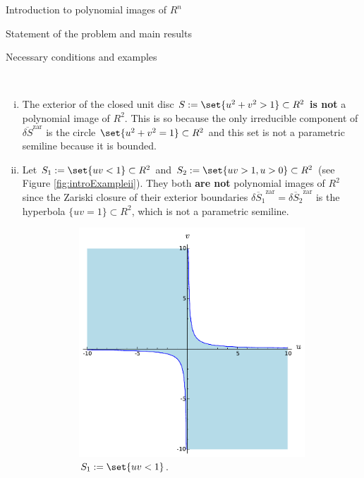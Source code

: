 \documentclass[11pt, a4paper, english, twoside, notitlepage, openright]{report}
\begin{document}
\begin{chapter}{Introduction to polynomial images of $R^n$}
\begin{section}{Statement of the problem and main results}
\begin{subsection}{Necessary conditions and examples}
\begin{examples}\label{introExample}
\
\begin{enumerate}[(i)]
\item The exterior of the closed unit disc $S:=\set{u^2+v^2>1}\subset R^2$ \textbf{is not} a polynomial image of $R^2$. This is so because the only irreducible component of $\overline{\delta S}^{\text{zar}}$ is the circle $\set{u^2+v^2=1}\subset R^2$ and this set is not a parametric semiline because it is bounded.
			
\item Let $S_1:=\set{uv<1}\subset R^2$ and $S_2:=\set{uv>1,u>0}\subset R^2$ (see Figure \ref{fig:introExampleii}). They both \textbf{are not} polynomial images of $R^2$ since the Zariski closure of their exterior boundaries $\overline{\delta S_1}^{\text{zar}}=\overline{\delta S_2}^{\text{zar}}$ is the hyperbola $\{uv=1\}\subset R^2$, which is not a parametric semiline.
\begin{figure}[h]\hspace{0.1cm}
\begin{subfigure}{.49\linewidth}\centering
\includegraphics[width=1\textwidth]{plots/ch1_01_S_1.pdf}
\caption{$S_1:=\set{uv<1}$.\label{fig:S_1}}
\end{subfigure}
\begin{subfigure}{.49\linewidth}\centering

\end{subfigure}
\end{figure}
\end{enumerate}
\end{examples}
\end{subsection}
\end{section}
\end{chapter}
\end{document}
